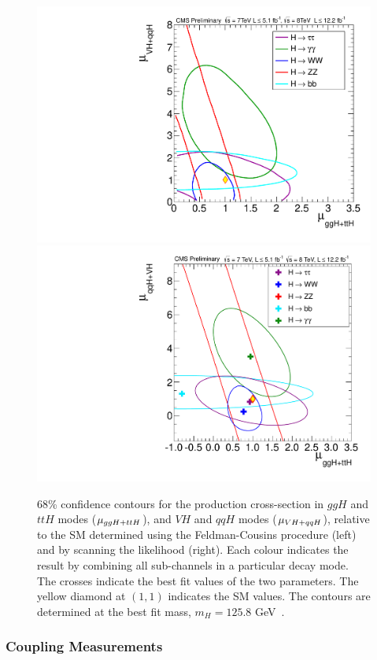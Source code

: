\begin{figure}
\begin{center}
\includegraphics[width=.49\textwidth]{combinations/sqr_rvrf_fc_2d.pdf}
\includegraphics[width=.49\textwidth]{combinations/sqr_rvrf_scan_2d_all_68.pdf}
\end{center}
\caption{68\% confidence contours for the production cross-section in 
$ggH$ and $ttH$ modes ($\mu_{ggH+ttH}$), and $VH$ and $qqH$ modes ($\mu_{VH+qqH}$), 
relative to the SM determined using the Feldman-Cousins procedure (left) and 
by scanning the likelihood (right). 
Each colour indicates the result by combining all sub-channels in a particular
decay mode. The crosses indicate the best fit values of the two parameters.
The yellow diamond at $(1,1)$ indicates the SM values. 
The contours are determined at the best fit mass, $m_{H}=125.8$ GeV~\citep{HIG-12-045}.}
\label{fig:fc2d}
\end{figure}


\subsubsection{Coupling Measurements}
\label{sec:coupling}

